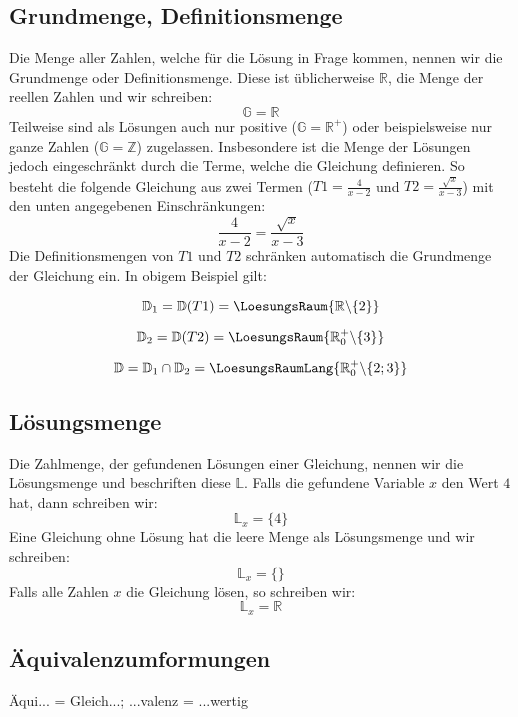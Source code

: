 \TALS{}
  
  \subsection{Grundmenge, Definitionsmenge}
  Die Menge aller Zahlen, welche für die Lösung in Frage kommen,
  nennen wir die Grundmenge oder Definitionsmenge. Diese ist üblicherweise $\mathbb{R}$, die
  Menge der reellen Zahlen und wir schreiben:
  $$\mathbb{G}=\mathbb{R}$$
  Teilweise sind als Lösungen auch nur positive ($\mathbb{G}=\mathbb{R}^+$) oder
  beispielsweise nur ganze Zahlen ($\mathbb{G}=\mathbb{Z}$)
  zugelassen.
  Insbesondere ist die Menge der Lösungen jedoch eingeschränkt durch
  die Terme, welche die Gleichung definieren. So besteht die folgende
  Gleichung aus zwei Termen ($T1=\frac{4}{x-2}$ und $T2=\frac{\sqrt{x}}{x-3}$) mit den unten angegebenen
  Einschränkungen:
  $$\frac{4}{x-2}=\frac{\sqrt{x}}{x-3}$$
  Die Definitionsmengen von $T1$ und $T2$ schränken automatisch die
  Grundmenge der Gleichung ein. In obigem Beispiel gilt:
  
  $$\mathbb{D}_1=\mathbb{D}(T1)=\LoesungsRaum{\mathbb{R}\backslash\{2\}}$$

  $$\mathbb{D}_2=\mathbb{D}(T2)=\LoesungsRaum{\mathbb{R}^+_0\backslash\{3\}}$$

  $$\mathbb{D}=\mathbb{D}_1\cap\mathbb{D}_2=\LoesungsRaumLang{\mathbb{R}^{+}_{0}\backslash\{2;3\}}$$

  
  \subsection{Lösungsmenge}
  Die Zahlmenge, der gefundenen Lösungen einer Gleichung, nennen wir
  die Lösungsmenge und beschriften diese $\mathbb{L}$. Falls die gefundene
  Variable $x$ \zB{} den Wert $4$ hat, dann schreiben wir:
  $$\mathbb{L}_x=\{4\}$$
  Eine Gleichung ohne Lösung hat die leere Menge als Lösungsmenge und
  wir schreiben:
  $$\mathbb{L}_x=\{\}$$
  Falls alle Zahlen $x$ die Gleichung lösen, so schreiben wir:
  $$\mathbb{L}_x=\mathbb{R}$$

  
\newpage
\subsection{Äquivalenzumformungen}
Äqui... = Gleich...; ...valenz = ...wertig

